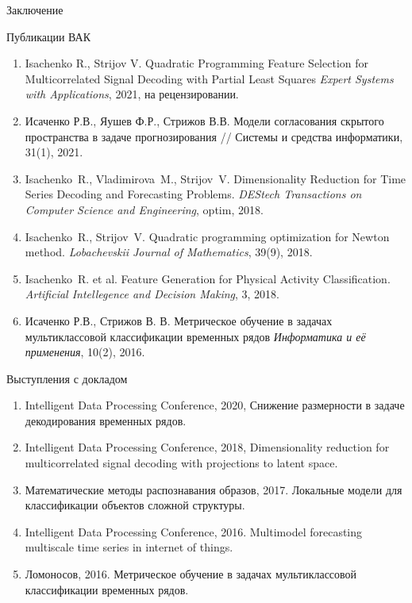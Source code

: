 \documentclass[10pt]{beamer}
\begin{document}
\begin{frame}{Заключение}
	\vspace{-0.1cm}
	\begin{block}{Публикации ВАК}
		\vspace{-0.1cm}
		{\scriptsize
		\begin{enumerate}
			\item Isachenko R., Strijov V. Quadratic Programming Feature Selection for Multicorrelated Signal Decoding with Partial Least Squares \emph{Expert Systems with Applications}, 2021, на рецензировании.
			\item Исаченко Р.В., Яушев Ф.Р., Стрижов В.В. Модели согласования скрытого пространства в задаче прогнозирования // Системы и средства информатики, 31(1), 2021.
			\item Isachenko~R., Vladimirova~M., Strijov~V. Dimensionality Reduction for Time Series Decoding and Forecasting Problems. \emph{DEStech Transactions on Computer Science and Engineering}, optim, 2018.
			\item Isachenko~R., Strijov~V. Quadratic programming optimization for Newton method. \emph{Lobachevskii Journal of Mathematics}, 39(9), 2018.
			\item Isachenko~R. et al. Feature Generation for Physical Activity Classification. \emph{Artificial Intellegence and Decision Making}, 3, 2018.
			\item Исаченко Р.В., Стрижов В. В. Метрическое обучение в задачах мультиклассовой классификации временных рядов \emph{Информатика и её применения}, 10(2), 2016.
		\end{enumerate}
	}
	\end{block}
\vspace{-0.3cm}
\begin{block}{Выступления с докладом}
	\vspace{-0.1cm}
	{\scriptsize
	\begin{enumerate}
		\item  Intelligent Data Processing Conference, 2020, Снижение размерности в задаче декодирования временных рядов.
		\item  Intelligent Data Processing Conference, 2018, Dimensionality reduction for multicorrelated signal decoding with projections to latent space. 
		\item Математические методы распознавания образов, 2017. Локальные модели для классификации объектов сложной структуры.
		\item Intelligent Data Processing Conference, 2016. Multimodel forecasting multiscale time series in internet of things.
		\item Ломоносов, 2016. Метрическое обучение в задачах мультиклассовой классификации временных рядов.
	\end{enumerate}
	}
\end{block}
\end{frame}
\end{document}
